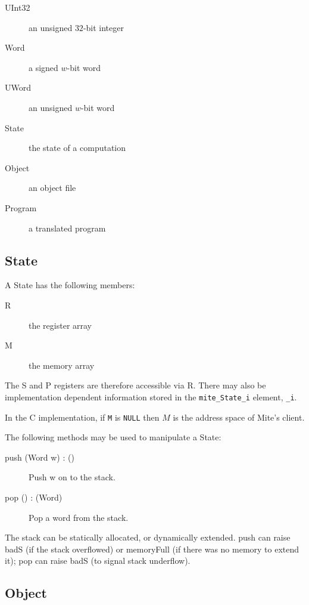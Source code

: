 \documentclass[english]{scrartcl}
\newcommand{\absfont}{\sffamily}
\newcommand{\abs}[1]{{\absfont #1}}
\begin{document}
\begin{description}
\item[\abs{UInt32}]an unsigned $32$-bit integer
\item[\abs{Word}]a signed $w$-bit word
\item[\abs{UWord}]an unsigned $w$-bit word
\item[\abs{State}]the state of a computation
\item[\abs{Object}]an object file
\item[\abs{Program}]a translated program
\end{description}


\subsection{State} \label{state}

A \abs{State} has the following members:

\begin{description}
\item[\abs{R}]the register array
\item[\abs{M}]the memory array
\end{description}

\noindent The \abs{S} and \abs{P} registers are therefore accessible via
\abs{R}. There may also be implementation dependent information stored
in the \verb|mite_State_i| element, \verb|_i|.

\noindent In the C implementation, if \verb|M| is \verb|NULL| then $M$ is the
address space of Mite's client.

The following methods may be used to manipulate a \abs{State}:

\begin{description}
\item[\abs{push} (\abs{Word} \abs{w}) : ()]Push \abs{w} on to the stack.
\item[\abs{pop} () : (\abs{Word})]Pop a word from the stack.
\end{description}

\noindent The stack can be statically allocated, or dynamically extended.
\abs{push} can raise \abs{badS} (if the stack overflowed) or
\abs{memoryFull} (if there was no memory to extend it); \abs{pop} can
raise \abs{badS} (to signal stack underflow).


\subsection{Object}
\end{document}

